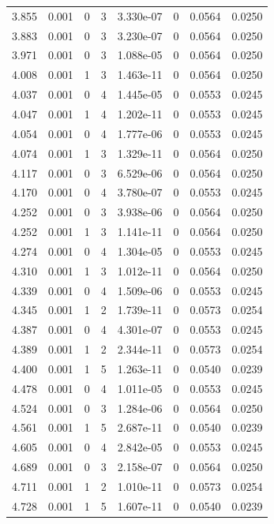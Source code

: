\documentclass[preview]{standalone}
\begin{document}
{{{\begin{tabular}{L{1.2cm}C{1.2cm} C{0.3cm}C{0.5cm} C{1.4cm}C{1.4cm} C{1.4cm}C{1.4cm}}
  3.855  &  0.001  & 0     &  3 &  3.330e-07  & 0  & 0.0564 &  0.0250   \\ 
  3.883  &  0.001  & 0     &  3 &  3.230e-07  & 0  & 0.0564 &  0.0250   \\ 
  3.971  &  0.001  & 0     &  3 &  1.088e-05  & 0  & 0.0564 &  0.0250   \\ 
  4.008  &  0.001  & 1     &  3 &  1.463e-11  & 0  & 0.0564 &  0.0250   \\ 
  4.037  &  0.001  & 0     &  4 &  1.445e-05  & 0  & 0.0553 &  0.0245   \\ 
  4.047  &  0.001  & 1     &  4 &  1.202e-11  & 0  & 0.0553 &  0.0245   \\ 
  4.054  &  0.001  & 0     &  4 &  1.777e-06  & 0  & 0.0553 &  0.0245   \\ 
  4.074  &  0.001  & 1     &  3 &  1.329e-11  & 0  & 0.0564 &  0.0250   \\ 
  4.117  &  0.001  & 0     &  3 &  6.529e-06  & 0  & 0.0564 &  0.0250   \\ 
  4.170  &  0.001  & 0     &  4 &  3.780e-07  & 0  & 0.0553 &  0.0245   \\ 
  4.252  &  0.001  & 0     &  3 &  3.938e-06  & 0  & 0.0564 &  0.0250   \\ 
  4.252  &  0.001  & 1     &  3 &  1.141e-11  & 0  & 0.0564 &  0.0250   \\ 
  4.274  &  0.001  & 0     &  4 &  1.304e-05  & 0  & 0.0553 &  0.0245   \\ 
  4.310  &  0.001  & 1     &  3 &  1.012e-11  & 0  & 0.0564 &  0.0250   \\ 
  4.339  &  0.001  & 0     &  4 &  1.509e-06  & 0  & 0.0553 &  0.0245   \\ 
  4.345  &  0.001  & 1     &  2 &  1.739e-11  & 0  & 0.0573 &  0.0254   \\ 
  4.387  &  0.001  & 0     &  4 &  4.301e-07  & 0  & 0.0553 &  0.0245   \\ 
  4.389  &  0.001  & 1     &  2 &  2.344e-11  & 0  & 0.0573 &  0.0254   \\ 
  4.400  &  0.001  & 1     &  5 &  1.263e-11  & 0  & 0.0540 &  0.0239   \\ 
  4.478  &  0.001  & 0     &  4 &  1.011e-05  & 0  & 0.0553 &  0.0245   \\ 
  4.524  &  0.001  & 0     &  3 &  1.284e-06  & 0  & 0.0564 &  0.0250   \\ 
  4.561  &  0.001  & 1     &  5 &  2.687e-11  & 0  & 0.0540 &  0.0239   \\ 
  4.605  &  0.001  & 0     &  4 &  2.842e-05  & 0  & 0.0553 &  0.0245   \\ 
  4.689  &  0.001  & 0     &  3 &  2.158e-07  & 0  & 0.0564 &  0.0250   \\ 
  4.711  &  0.001  & 1     &  2 &  1.010e-11  & 0  & 0.0573 &  0.0254   \\ 
  4.728  &  0.001  & 1     &  5 &  1.607e-11  & 0  & 0.0540 &  0.0239   \\ 
\hline 
\end{tabular} 

}}}
\end{document}

